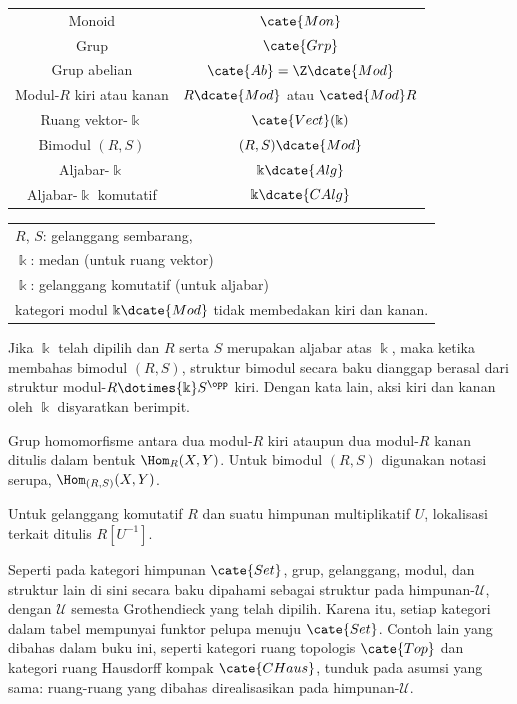 \begin{center}\small \begin{tabular}{|c|c|}\hline
	Monoid & $\cate{Mon}$ \\
	Grup &  $\cate{Grp}$ \\
	Grup abelian & $\cate{Ab} = \Z\dcate{Mod}$ \\
	Modul-$R$ kiri atau kanan & $R\dcate{Mod}$ atau $\cated{Mod}R$ \\
	Ruang vektor-$\Bbbk$ & $\cate{Vect}(\Bbbk)$ \\
	Bimodul $(R,S)$ & $(R,S)\dcate{Mod}$ \\
	Aljabar-$\Bbbk$ & $\Bbbk\dcate{Alg}$ \\
	Aljabar-$\Bbbk$ komutatif & $\Bbbk\dcate{CAlg}$
	\\ \hline
\end{tabular} \quad \begin{tabular}{l}
	$R$, $S$: gelanggang sembarang, \\
	$\Bbbk$: medan (untuk ruang vektor) \\
	$\Bbbk$: gelanggang komutatif (untuk aljabar) \\
	kategori modul $\Bbbk\dcate{Mod}$ tidak membedakan kiri dan kanan.
\end{tabular}\end{center}

Jika $\Bbbk$ telah dipilih dan $R$ serta $S$ merupakan aljabar atas $\Bbbk$,
maka ketika membahas bimodul $(R,S)$, struktur bimodul secara baku dianggap
berasal dari struktur modul-$R \dotimes{\Bbbk} S^{\opp}$ kiri. Dengan kata lain,
aksi kiri dan kanan oleh $\Bbbk$ disyaratkan berimpit.

Grup homomorfisme antara dua modul-$R$ kiri ataupun dua modul-$R$ kanan
ditulis dalam bentuk $\Hom_R(X, Y)$. Untuk bimodul $(R,S)$ digunakan notasi serupa,
$\Hom_{(R, S)}(X, Y)$.

Untuk gelanggang komutatif $R$ dan suatu himpunan multiplikatif $U$, lokalisasi
terkait ditulis $R[U^{-1}]$.

Seperti pada kategori himpunan $\cate{Set}$, grup, gelanggang, modul, dan struktur
lain di sini secara baku dipahami sebagai struktur pada himpunan-$\mathcal{U}$, dengan
$\mathcal{U}$ semesta Grothendieck yang telah dipilih. Karena itu, setiap
kategori dalam tabel mempunyai funktor pelupa menuju $\cate{Set}$. Contoh lain
yang dibahas dalam buku ini, seperti kategori ruang topologis $\cate{Top}$ dan
kategori ruang Hausdorff kompak $\cate{CHaus}$, tunduk pada asumsi yang sama:
ruang-ruang yang dibahas direalisasikan pada himpunan-$\mathcal{U}$.

